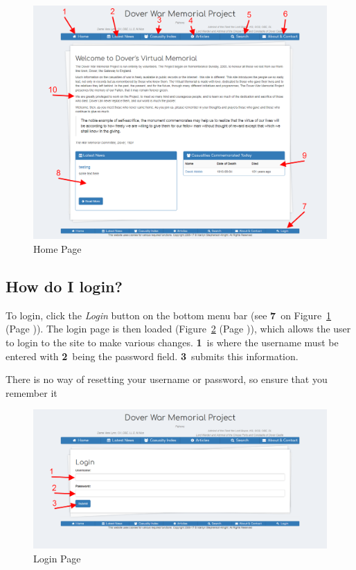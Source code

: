 \documentclass[12pt]{article}
\newcommand{\marker}[1]{\color{red}\textbf{#1}\color{black}}
\newcommand{\myref}[1]{\ref{#1} {\scriptsize(Page \pageref{#1})}}
\begin{document}
\begin{figure}[h]
  \centering
 \includegraphics[width=.9\textwidth]{pics/home.png}
	\caption{Home Page}\label{fig:home}
\end{figure}

\newpage
\FloatBarrier
\subsection{How do I login?}\label{ssec:login}
To login, click the \textit{Login} button on the bottom menu bar (see \marker{7}\ on Figure~\myref{fig:home}). The login page is then loaded (Figure~\myref{fig:login}), which allows the user to login to the site to make various changes. \marker{1}\ is where the username must be entered with \marker{2}\ being the password field. \marker{3}\ submits this information.

\begin{warningBox}
There is no way of resetting your username or password, so ensure that you remember it
\end{warningBox}

\begin{figure}[h]
  \centering
 \includegraphics[width=.9\textwidth]{pics/login.png}
	\caption{Login Page}\label{fig:login}
\end{figure}
\end{document}
